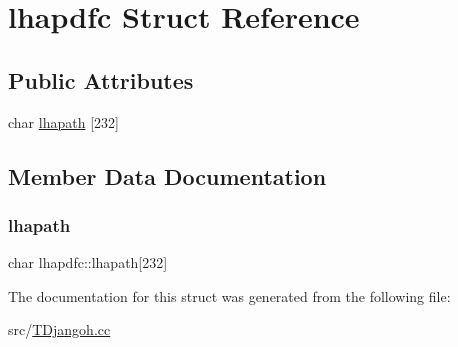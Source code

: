 \hypertarget{structlhapdfc}{}\section{lhapdfc Struct Reference}
\label{structlhapdfc}
\subsection*{Public Attributes}
\begin{DoxyCompactItemize}
\item 
char \hyperlink{structlhapdfc_aafcf41334e1e68f6297c3e4416bff9f3}{lhapath} \mbox{[}232\mbox{]}
\end{DoxyCompactItemize}


\subsection{Member Data Documentation}
\mbox{\label{structlhapdfc_aafcf41334e1e68f6297c3e4416bff9f3}} 
\subsubsection{\texorpdfstring{lhapath}{lhapath}}
{\footnotesize\ttfamily char lhapdfc\+::lhapath\mbox{[}232\mbox{]}}



The documentation for this struct was generated from the following file\+:\begin{DoxyCompactItemize}
\item 
src/\hyperlink{_t_djangoh_8cc}{T\+Djangoh.\+cc}\end{DoxyCompactItemize}
